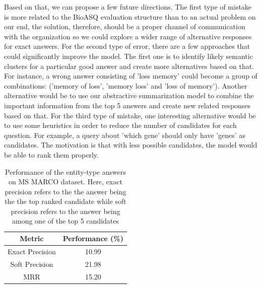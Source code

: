 Based on that, we can propose a few future directions. The first type of mistake is more related to the BioASQ evaluation structure than to an actual problem on our end, the solution, therefore, should be a proper channel of communication with the organization so we could explore a wider range of alternative responses for exact answers. For the second type of error, there are a few approaches that could significantly improve the model. The first one is to identify likely semantic clusters for a particular good answer and create more alternatives based on that. For instance, a wrong answer consisting of 'loss memory' could become a group of combinations: ('memory of loss', 'memory loss' and 'loss of memory'). Another alternative would be to use our abstractive summarization model to combine the important information from the top 5 answers and create new related responses based on that. For the third type of mistake, one interesting alternative would be to use some heuristics in order to reduce the number of candidates for each question. For example, a query about 'which gene' should only have 'genes' as candidates. The motivation is that with less possible candidates, the model would be able to rank them properly.

\begin{table}[h]
    \centering
    \begin{tabular}{c|c} \hline
        \textbf{Metric} & \textbf{Performance (\%)} \\ \hline
        Exact Precision &  10.99 \\
        Soft Precision & 21.98 \\
        MRR & 15.20 \\ \hline
    \end{tabular}
    \caption{Performance of the entity-type answers on MS MARCO dataset. Here, exact precision refers to the the answer being the the top ranked candidate while soft precision refers to the answer being among one of the top 5 candidates}
    \label{tab:entity_marco}
\end{table}


